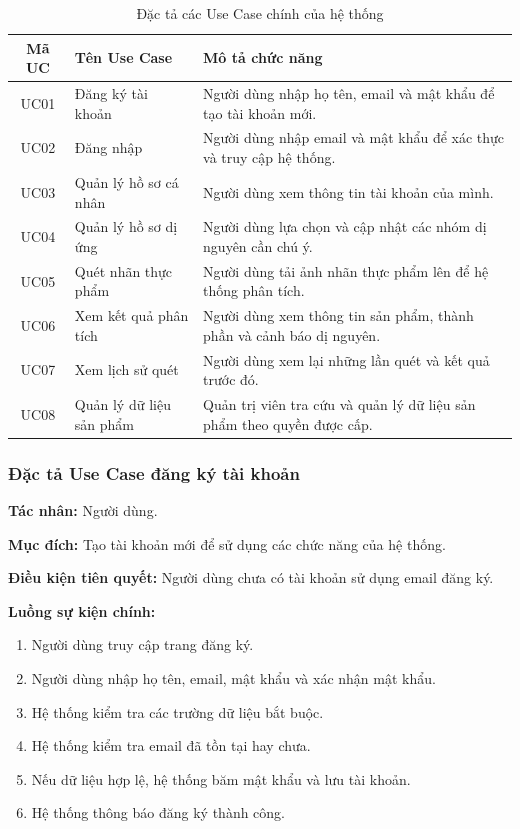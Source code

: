 \begin{table}[H]
	\centering
	\caption{Đặc tả các Use Case chính của hệ thống}
	\label{tab:usecase-description}
	\small
	\begin{tabularx}{\textwidth}{|c|l|X|}
		\hline
		\textbf{Mã UC} & \textbf{Tên Use Case} & \textbf{Mô tả chức năng} \\
		\hline
		UC01 & Đăng ký tài khoản & Người dùng nhập họ tên, email và mật khẩu để tạo tài khoản mới. \\
		\hline
		UC02 & Đăng nhập & Người dùng nhập email và mật khẩu để xác thực và truy cập hệ thống. \\
		\hline
		UC03 & Quản lý hồ sơ cá nhân & Người dùng xem thông tin tài khoản của mình. \\
		\hline
		UC04 & Quản lý hồ sơ dị ứng & Người dùng lựa chọn và cập nhật các nhóm dị nguyên cần chú ý. \\
		\hline
		UC05 & Quét nhãn thực phẩm & Người dùng tải ảnh nhãn thực phẩm lên để hệ thống phân tích. \\
		\hline
		UC06 & Xem kết quả phân tích & Người dùng xem thông tin sản phẩm, thành phần và cảnh báo dị nguyên. \\
		\hline
		UC07 & Xem lịch sử quét & Người dùng xem lại những lần quét và kết quả trước đó. \\
		\hline
		UC08 & Quản lý dữ liệu sản phẩm & Quản trị viên tra cứu và quản lý dữ liệu sản phẩm theo quyền được cấp. \\
		\hline
	\end{tabularx}
\end{table}

\subsubsection{Đặc tả Use Case đăng ký tài khoản}

\textbf{Tác nhân:} Người dùng.

\textbf{Mục đích:} Tạo tài khoản mới để sử dụng các chức năng của hệ thống.

\textbf{Điều kiện tiên quyết:} Người dùng chưa có tài khoản sử dụng email đăng ký.

\textbf{Luồng sự kiện chính:}
\begin{enumerate}
	\item Người dùng truy cập trang đăng ký.
	\item Người dùng nhập họ tên, email, mật khẩu và xác nhận mật khẩu.
	\item Hệ thống kiểm tra các trường dữ liệu bắt buộc.
	\item Hệ thống kiểm tra email đã tồn tại hay chưa.
	\item Nếu dữ liệu hợp lệ, hệ thống băm mật khẩu và lưu tài khoản.
	\item Hệ thống thông báo đăng ký thành công.
\end{enumerate}

